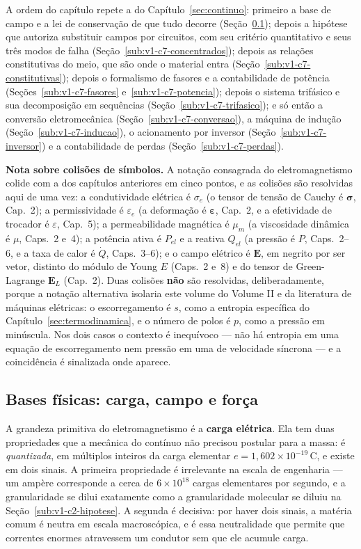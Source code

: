 \documentclass[12pt,a4paper]{article}
\numberwithin{equation}{section}
\numberwithin{table}{section}
\numberwithin{figure}{section}
\begin{document}
A ordem do capítulo repete a do Capítulo~\ref{sec:continuo}: primeiro a base
de campo e a lei de conservação de que tudo decorre
(Seção~\ref{sub:v1-c7-bases}); depois a hipótese que autoriza substituir campos
por circuitos, com seu critério quantitativo e seus três modos de falha
(Seção~\ref{sub:v1-c7-concentrados}); depois as relações constitutivas do meio,
que são onde o material entra (Seção~\ref{sub:v1-c7-constitutivas}); depois o
formalismo de fasores e a contabilidade de potência
(Seções~\ref{sub:v1-c7-fasores} e~\ref{sub:v1-c7-potencia}); depois o sistema
trifásico e sua decomposição em sequências
(Seção~\ref{sub:v1-c7-trifasico}); e só então a conversão eletromecânica
(Seção~\ref{sub:v1-c7-conversao}), a máquina de indução
(Seção~\ref{sub:v1-c7-inducao}), o acionamento por inversor
(Seção~\ref{sub:v1-c7-inversor}) e a contabilidade de perdas
(Seção~\ref{sub:v1-c7-perdas}).

\textbf{Nota sobre colisões de símbolos.} A notação consagrada do
eletromagnetismo colide com a dos capítulos anteriores em cinco pontos, e as
colisões são resolvidas aqui de uma vez: a condutividade elétrica é
$\sigma_e$ (o tensor de tensão de Cauchy é $\boldsymbol{\sigma}$, Cap.~2); a
permissividade é $\varepsilon_e$ (a deformação é $\boldsymbol{\varepsilon}$,
Cap.~2, e a efetividade de trocador é $\varepsilon$, Cap.~5); a permeabilidade
magnética é $\mu_m$ (a viscosidade dinâmica é $\mu$, Caps.~2 e~4); a potência
ativa é $P_{el}$ e a reativa $Q_{el}$ (a pressão é $P$, Caps.~2--6, e a taxa de
calor é $\dot{Q}$, Caps.~3--6); e o campo elétrico é $\mathbf{E}$, em negrito
por ser vetor, distinto do módulo de Young $E$ (Caps.~2 e~8) e do tensor de
Green-Lagrange $\mathbf{E}_L$ (Cap.~2). Duas colisões \textbf{não} são
resolvidas, deliberadamente, porque a notação alternativa isolaria este volume
do Volume II e da literatura de máquinas elétricas: o escorregamento é $s$,
como a entropia específica do Capítulo~\ref{sec:termodinamica}, e o número de
polos é $p$, como a pressão em minúscula. Nos dois casos o contexto é
inequívoco --- não há entropia em uma equação de escorregamento nem pressão em
uma de velocidade síncrona --- e a coincidência é sinalizada onde aparece.

\subsection{Bases físicas: carga, campo e força}\label{sub:v1-c7-bases}

A grandeza primitiva do eletromagnetismo é a \textbf{carga elétrica}. Ela tem
duas propriedades que a mecânica do contínuo não precisou postular para a
massa: é \emph{quantizada}, em múltiplos inteiros da carga elementar
$e = 1{,}602\times10^{-19}\,$C, e existe em dois sinais. A primeira propriedade
é irrelevante na escala de engenharia --- um ampère corresponde a cerca de
$6\times10^{18}$ cargas elementares por segundo, e a granularidade se dilui
exatamente como a granularidade molecular se diluiu na
Seção~\ref{sub:v1-c2-hipotese}. A segunda é decisiva: por haver dois sinais, a
matéria comum é neutra em escala macroscópica, e é essa neutralidade que
permite que correntes enormes atravessem um condutor sem que ele acumule carga.
\end{document}
